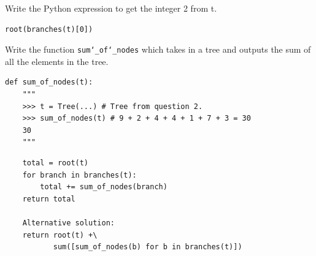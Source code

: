 \documentclass{exam}
\begin{document}
\begin{questions}
\begin{blocksection}
\question Write the Python expression to get the integer 2 from t.

\begin{solution}[0.25in]
\begin{lstlisting}
root(branches(t)[0])
\end{lstlisting}
\end{solution}

\end{blocksection}

\begin{blocksection}
\question Write the function \texttt{sum\char`_of\char`_nodes} which takes in a
tree and outputs the sum of all the elements in the tree.
\end{blocksection}

\begin{lstlisting}
def sum_of_nodes(t):
    """
    >>> t = Tree(...) # Tree from question 2.
    >>> sum_of_nodes(t) # 9 + 2 + 4 + 4 + 1 + 7 + 3 = 30
    30
    """
\end{lstlisting}
\begin{solution}[4in]
\begin{lstlisting}
    total = root(t)
    for branch in branches(t):
        total += sum_of_nodes(branch)
    return total

    Alternative solution:
    return root(t) +\
           sum([sum_of_nodes(b) for b in branches(t)])
\end{lstlisting}
\end{solution}

\end{questions}

\end{document}
